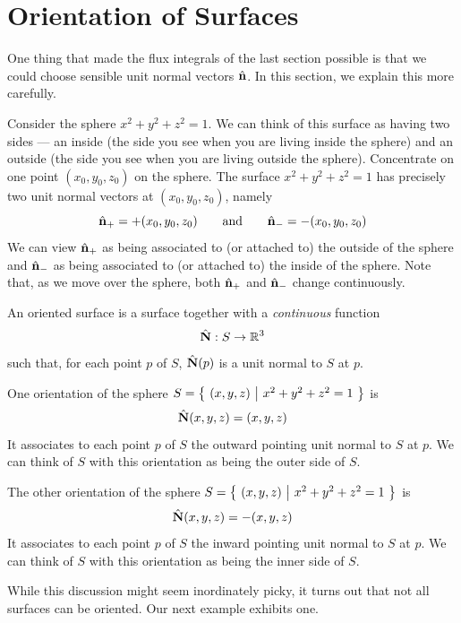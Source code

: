 \section{Orientation of Surfaces}\label{sec:orientation}

One thing that made the flux integrals of the last section possible
is that we could choose sensible unit normal vectors $\hat{\mathbf{n}}$. In this section,
we explain this more carefully.


Consider the sphere $x^2+y^2+z^2=1$. We can think of this surface as having two
sides --- an inside (the side you see when you are living inside the
sphere) and an outside (the side you see when you are living outside the
sphere). Concentrate on one point $(x_0,y_0,z_0)$ on the sphere. 
The surface $x^2+y^2+z^2=1$ has precisely two unit normal vectors at
$(x_0,y_0,z_0)$, namely
\begin{equation*}
\hat{\mathbf{n}}_+ =  +(x_0,y_0,z_0)\qquad\text{and}\qquad
\hat{\mathbf{n}}_- = -(x_0,y_0,z_0)
\end{equation*}
We can view $\hat{\mathbf{n}}_+$ as being associated to (or attached to)
the outside of the sphere and $\hat{\mathbf{n}}_-$ as being associated to (or attached to)
the inside of the sphere. Note that, as we move over the sphere,
both $\hat{\mathbf{n}}_+$ and $\hat{\mathbf{n}}_-$ change continuously.

\begin{defn}\label{def:oriented}
An oriented surface is a surface together with a \emph{continuous} function
\begin{equation*}
\hat{\mathbf{N}}: S\rightarrow\mathbb{R}^3
\end{equation*}
such that, for each point $p$ of $S$, $\hat{\mathbf{N}}(p)$ is a unit normal to $S$ at $p$.
\end{defn}

\begin{eg}[Sphere]\label{eg:orientSphere}
One orientation of the sphere $S=\big\{ \ (x,y,z)\ \big|\ x^2+y^2+z^2=1\ \big\}$ is
\begin{equation*}
\hat{\mathbf{N}}(x,y,z) = (x,y,z)
\end{equation*}
It associates to each point $p$ of $S$ the outward pointing unit normal
to $S$ at $p$. We can think of $S$ with this orientation as being the outer
side of $S$.

The other orientation of the sphere $S=\big\{ \ (x,y,z)\ \big|\ x^2+y^2+z^2=1\ \big\}$ is
\begin{equation*}
\hat{\mathbf{N}}(x,y,z) = -(x,y,z)
\end{equation*}
It associates to each point $p$ of $S$ the inward pointing unit normal
to $S$ at $p$. We can think of $S$ with this orientation as being the inner
side of $S$. 

While this discussion might seem inordinately picky,
it turns out that not all surfaces can be oriented. Our next example
exhibits one.
\end{eg}

